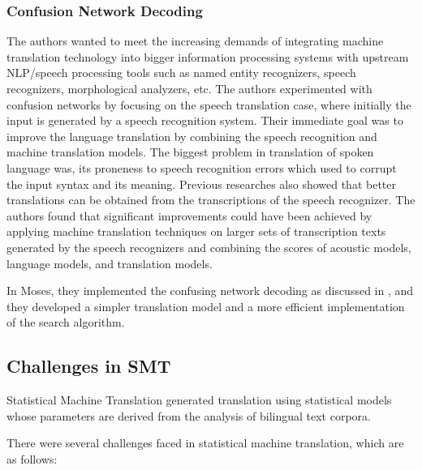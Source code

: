 \subsubsection{Confusion Network Decoding}
The authors wanted to meet the increasing demands of integrating machine translation technology into bigger information processing systems with upstream NLP/speech processing tools such as named entity recognizers, speech recognizers, morphological analyzers, etc. The authors experimented with confusion networks by focusing on the speech translation case, where initially the input is generated by a speech recognition system. Their immediate goal was to improve the language translation by combining the speech recognition and machine translation models. The biggest problem in translation of spoken language was, its proneness to speech recognition errors which used to corrupt the input syntax and its meaning. Previous researches also showed that better translations can be obtained from the transcriptions of the speech recognizer.  The authors found that significant improvements could have been achieved by applying machine translation techniques on larger sets of transcription texts generated by the speech recognizers and combining the scores of acoustic models, language models, and translation models. 

In Moses, they implemented the confusing network decoding as discussed in \citep{4218346}, and they developed a simpler translation model and a more efficient implementation of the search algorithm.

\subsection{Challenges in SMT}

Statistical Machine Translation generated translation using statistical models whose parameters are derived from the analysis of bilingual text corpora. 

There were several challenges faced in statistical machine translation, which are as follows\citep{wiki:smt}:

